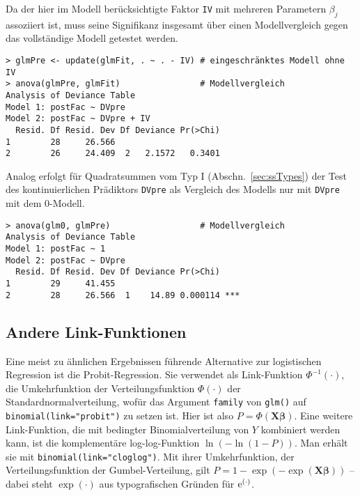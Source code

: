 Da der hier im Modell berücksichtigte Faktor \lstinline!IV! mit mehreren Parametern $\beta_{j}$ assoziiert ist, muss seine Signifikanz insgesamt über einen Modellvergleich gegen das vollständige Modell getestet werden.
\begin{lstlisting}
> glmPre <- update(glmFit, . ~ . - IV) # eingeschränktes Modell ohne IV
> anova(glmPre, glmFit)                # Modellvergleich
Analysis of Deviance Table
Model 1: postFac ~ DVpre
Model 2: postFac ~ DVpre + IV
  Resid. Df Resid. Dev Df Deviance Pr(>Chi)
1        28     26.566
2        26     24.409  2   2.1572   0.3401
\end{lstlisting}

Analog erfolgt für Quadratsummen vom Typ I (Abschn.\ \ref{sec:ssTypes}) der Test des kontinuierlichen Prädiktors \lstinline!DVpre! als Vergleich des Modells nur mit \lstinline!DVpre! mit dem $0$-Modell.
\begin{lstlisting}
> anova(glm0, glmPre)                  # Modellvergleich
Analysis of Deviance Table
Model 1: postFac ~ 1
Model 2: postFac ~ DVpre
  Resid. Df Resid. Dev Df Deviance Pr(>Chi)
1        29     41.455
2        28     26.566  1    14.89 0.000114 ***
\end{lstlisting}

\subsection{Andere Link-Funktionen}
\label{sec:glmOtherLink}

Eine meist zu ähnlichen Ergebnissen führende Alternative zur logistischen Regression ist die Probit-Regression. Sie verwendet als Link-Funktion $\Phi^{-1}(\cdot)$, die Umkehrfunktion der Verteilungsfunktion $\Phi(\cdot)$ der Standardnormalverteilung, wofür das Argument \lstinline!family! von \lstinline!glm()! auf \lstinline!binomial(link="probit")! zu setzen ist. Hier ist also $P = \Phi(\bm{X} \bm{\beta})$. Eine weitere Link-Funktion, die mit bedingter Binomialverteilung von $Y$ kombiniert werden kann, ist die komplementäre log-log-Funktion $\ln(-\ln(1-P))$. Man erhält sie mit \lstinline!binomial(link="cloglog")!. Mit ihrer Umkehrfunktion, der Verteilungsfunktion der Gumbel-Verteilung, gilt $P = 1 - \exp(-\exp(\bm{X} \bm{\beta}))$ -- dabei steht $\exp(\cdot)$ aus typografischen Gründen für ${\mathrm{e}}^{(\cdot)}$.

